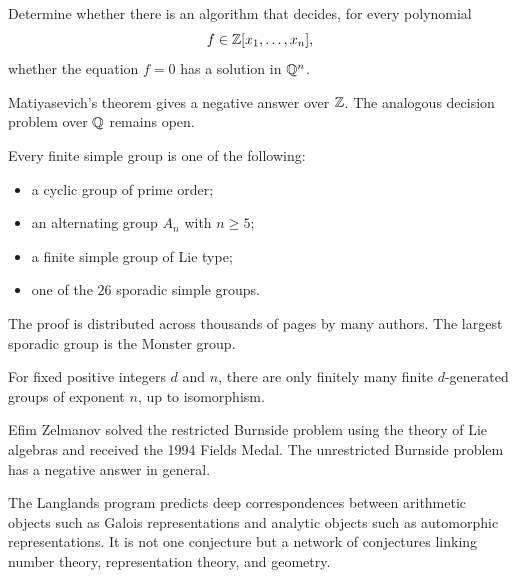     \begin{openproblem}
        Determine whether there is an algorithm that decides, for every
        polynomial
        \[
            f\in\mathbb{Z}[x_1,\dots,x_n],
        \]
        whether the equation $f=0$ has a solution in $\mathbb{Q}^n$.
    \end{openproblem}

    \begin{remark}
        Matiyasevich's theorem gives a negative answer over $\mathbb{Z}$. The analogous
        decision problem over $\mathbb{Q}$ remains open.
    \end{remark}

    \begin{theorem}
        Every finite simple group is one of the following:
        \begin{itemize}
            \item a cyclic group of prime order;
            \item an alternating group $A_n$ with $n\geq 5$;
            \item a finite simple group of Lie type;
            \item one of the $26$ sporadic simple groups.
        \end{itemize}
    \end{theorem}

    \begin{remark}
        The proof is distributed across thousands of pages by many authors.
        The largest sporadic group is the Monster group.
    \end{remark}

    \begin{theorem}
        For fixed positive integers $d$ and $n$, there are only finitely many
        finite $d$-generated groups of exponent $n$, up to isomorphism.
    \end{theorem}

    \begin{remark}
        Efim Zelmanov solved the restricted Burnside problem using the theory of
        Lie algebras and received the 1994 Fields Medal. The unrestricted
        Burnside problem has a negative answer in general.
    \end{remark}

    \begin{fact}
        The Langlands program predicts deep correspondences between arithmetic
        objects such as Galois representations and analytic objects such as
        automorphic representations. It is not one conjecture but a network of
        conjectures linking number theory, representation theory, and geometry.
    \end{fact}

